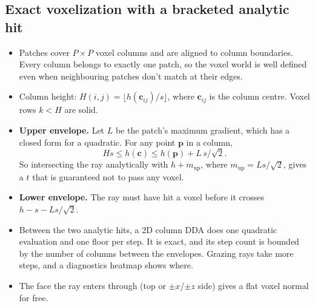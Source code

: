 \documentclass[11pt]{article}
\begin{document}
\subsection{Exact voxelization with a bracketed analytic hit}
\begin{itemize}
\item Patches cover $P\times P$ voxel columns and are aligned to column boundaries. Every column belongs to exactly one patch, so the voxel world is well defined even when neighbouring patches don't match at their edges.
\item Column height: $H(i,j)=\lfloor h(\mathbf c_{ij})/s\rfloor$, where $\mathbf c_{ij}$ is the column centre. Voxel rows $k<H$ are solid.
\item \textbf{Upper envelope.} Let $L$ be the patch's maximum gradient, which has a closed form for a quadratic. For any point $\mathbf p$ in a column,
\[
H s\le h(\mathbf c)\le h(\mathbf p)+L\,s/\sqrt2 .
\]
So intersecting the ray analytically with $h+m_{\text{up}}$, where $m_{\text{up}}=L s/\sqrt2$, gives a $t$ that is guaranteed not to pass any voxel.
\item \textbf{Lower envelope.} The ray must have hit a voxel before it crosses $h-s-L s/\sqrt2$.
\item Between the two analytic hits, a 2D column DDA does one quadratic evaluation and one floor per step. It is exact, and its step count is bounded by the number of columns between the envelopes. Grazing rays take more steps, and a diagnostics heatmap shows where.
\item The face the ray enters through (top or $\pm x$/$\pm z$ side) gives a flat voxel normal for free.
\end{itemize}
\end{document}
